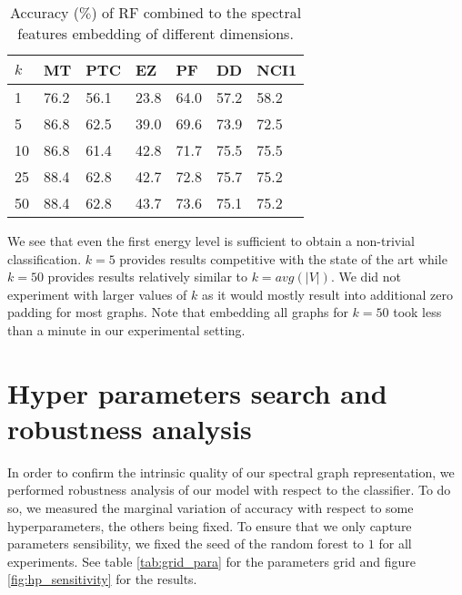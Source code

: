\documentclass{article}
\begin{document}
\begin{table}[h]
  \begin{center}
  \renewcommand{\arraystretch}{1.2}
    \begin{tabular}[t]{l|M{1.2cm} M{1.2cm} M{1.2cm} M{1.2cm} M{1.2cm} M{1.2cm}}
         $k$       & MT   &     PTC       &      EZ       & PF      & DD      & NCI1 \\
      & 76.2 & 56.1 & 23.8 & 64.0 &  57.2   & 58.2 \\
      5  & 86.8 & 62.5 & 39.0 & 69.6 &  73.9   & 72.5 \\
      10 & 86.8 & 61.4 & 42.8 & 71.7 &  75.5   & 75.5 \\
      25 & 88.4 & 62.8 & 42.7 & 72.8 &  75.7   & 75.2 \\
      50 & 88.4 & 62.8 & 43.7 & 73.6 &  75.1   & 75.2 \\
      
      \end{tabular}
      \renewcommand{\arraystretch}{4}
  \end{center}
  \caption{Accuracy ($\%$) of RF combined to the spectral features embedding of different dimensions.}
  \label{tab:k_results}
\end{table}

We see that even the first energy level is sufficient to obtain a non-trivial classification. $k=5$ provides results competitive with the state of the art while $k=50$ provides results relatively similar to $k= avg(|V|)$. We did not experiment with larger values of $k$ as it would mostly result into additional zero padding for most graphs. Note that embedding all graphs for $k=50$ took less than a minute in our experimental setting.


\section{Hyper parameters search and robustness analysis}
\label{app:robustness}

In order to confirm the intrinsic quality of our spectral graph representation, we performed robustness analysis of our model with respect to the classifier. To do so, we measured the marginal variation of accuracy with respect to some hyperparameters, the others being fixed.
To ensure that we only capture parameters sensibility, we fixed the seed of the random forest to $1$ for all experiments. See table \ref{tab:grid_para} for the parameters grid and figure \ref{fig:hp_sensitivity} for the results.
\end{document}
